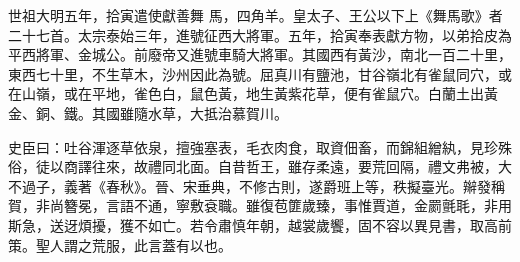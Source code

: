 \begin{pinyinscope}
 世祖大明五年，拾寅遣使獻善舞
 馬，四角羊。皇太子、王公以下上《舞馬歌》者二十七首。太宗泰始三年，進號征西大將軍。五年，拾寅奉表獻方物，以弟拾皮為平西將軍、金城公。前廢帝又進號車騎大將軍。其國西有黃沙，南北一百二十里，東西七十里，不生草木，沙州因此為號。屈真川有鹽池，甘谷嶺北有雀鼠同穴，或在山嶺，或在平地，雀色白，鼠色黃，地生黃紫花草，便有雀鼠穴。白蘭土出黃金、銅、鐵。其國雖隨水草，大抵治慕賀川。



 史臣曰：吐谷渾逐草依泉，擅強塞表，毛衣肉食，取資佃畜，而錦組繒紈，見珍殊俗，徒以商譯往來，故禮同北面。自昔哲王，雖存柔遠，要荒回隔，禮文弗被，大不過子，義著《春秋》。晉、宋垂典，不修古則，遂爵班上等，秩擬臺光。辮發稱賀，非尚簪冕，言語不通，寧敷袞職。雖復苞篚歲臻，事惟賈道，金罽氈毦，非用斯急，送迓煩擾，獲不如亡。若令肅慎年朝，越裳歲饗，固不容以異見書，取高前策。聖人謂之荒服，此言蓋有以也。



\end{pinyinscope}